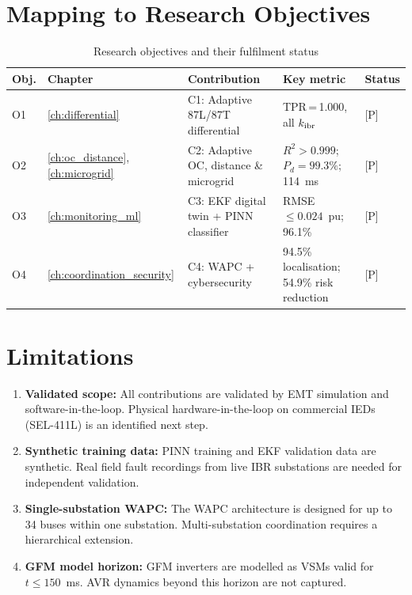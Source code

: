 \section{Mapping to Research Objectives}
\label{sec:ch13_objectives}

\begin{table}[htbp]
\caption{Research objectives and their fulfilment status}
\label{tab:ch13_objectives}
\small
\begin{tabularx}{\textwidth}{@{}lp{2.5cm}p{5cm}p{3cm}l@{}}
\toprule
Obj. & Chapter & Contribution & Key metric & Status \\
\midrule
O1 & \ref{ch:differential} & C1: Adaptive 87L/87T differential
  & TPR\,=\,1.000, all $k_\mathrm{ibr}$ & [P] \\
O2 & \ref{ch:oc_distance}, \ref{ch:microgrid} & C2: Adaptive OC, distance \& microgrid
  & $R^2 > 0.999$; $P_d = 99.3\%$; 114~ms & [P] \\
O3 & \ref{ch:monitoring_ml} & C3: EKF digital twin + PINN classifier
  & RMSE\,$\leq 0.024$~pu; 96.1\% & [P] \\
O4 & \ref{ch:coordination_security} & C4: WAPC + cybersecurity
  & 94.5\% localisation; 54.9\% risk reduction & [P] \\
\bottomrule
\end{tabularx}
\end{table}

\section{Limitations}
\label{sec:ch13_limitations}

\begin{enumerate}
\item \textbf{Validated scope:} All contributions are validated
      by EMT simulation and software-in-the-loop. Physical hardware-in-the-loop
      on commercial IEDs (SEL-411L) is an identified next step.

\item \textbf{Synthetic training data:} PINN training and EKF validation
      data are synthetic. Real field fault recordings from live IBR
      substations are needed for independent validation.

\item \textbf{Single-substation WAPC:} The WAPC architecture is designed
      for up to 34 buses within one substation. Multi-substation
      coordination requires a hierarchical extension.

\item \textbf{GFM model horizon:} GFM inverters are modelled as VSMs
      valid for $t \leq 150$~ms. AVR dynamics beyond this horizon are
      not captured.

\end{enumerate}

